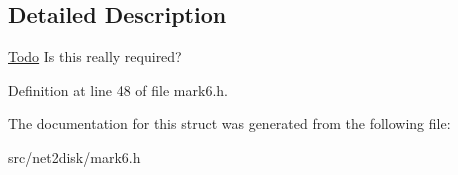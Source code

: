 \subsection{Detailed Description}
\begin{Desc}
\item[\hyperlink{todo__todo000003}{Todo}]Is this really required? \end{Desc}


Definition at line 48 of file mark6.h.



The documentation for this struct was generated from the following file:\begin{DoxyCompactItemize}
\item 
src/net2disk/mark6.h\end{DoxyCompactItemize}
